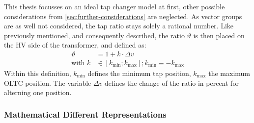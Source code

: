 This thesis focusses on an ideal tap changer model at first, other possible considerations from \autoref{sec:further-considerations} are neglected.
As vector groups are as well not considered, the tap ratio stays solely a rational number.
Like previously mentioned, and consequently described, the ratio $\vartheta$ is then placed on the \acs{HV} side of the transformer, and defined as:
\begin{align}
        \vartheta &= 1 + k \cdot \Delta v \label{eq:tap-ratio-hv} \\[6pt]
        \text{with } k &\in [k_\mathrm{min};k_\mathrm{max}]; k_\mathrm{min} \equiv  -k_\mathrm{max} \label{eq:tap-pos}
\end{align}
Within this definition, $k_\mathrm{min}$ defines the minimum tap position, $k_\mathrm{max}$ the maximum \acs{OLTC} position. 
The variable $\Delta v$ defines the change of the ratio in percent for alterning one position.


\subsubsection{Mathematical Different Representations}

